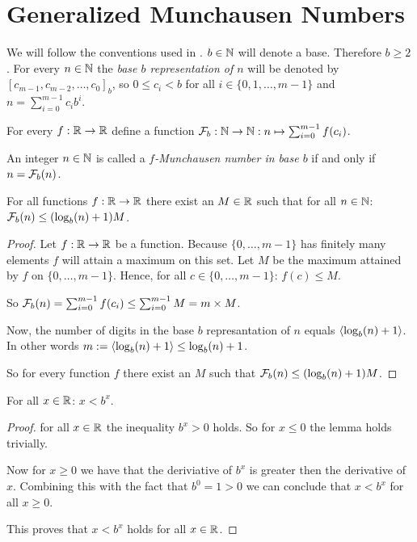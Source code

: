 \section*{Generalized Munchausen Numbers}

We will follow the conventions used in \cite{dvb}. $b\in\mathbb{N}$ will denote a base.
Therefore $b \ge 2$. For every $n \in \mathbb{N}$ the \emph{base $b$ representation
of $n$} will be denoted by $[c_{m-1}, c_{m-2}, \ldots, c_{0}]_{b}$, so 
$0 \le c_{i} < b$ for all $i \in \{0,1,\ldots,m-1\}$ and 
$n = \sum_{i=0}^{m-1} c_{i}b^{i}$.

For every $f : \mathbb{R} \rightarrow \mathbb{R}$ define a function $\mathcal{F}_{b} : \mathbb{N} \rightarrow
\mathbb{N} : n \mapsto \sum_{i=0}^{m-1} f(c_{i})$.

\begin{definition}
	An integer $n \in \mathbb{N}$ is called a \emph{$f$-Munchausen number in base $b$}
	if and only if $n = \mathcal{F}_{b}(n)$.
\end{definition}


\begin{proposition}
	For all functions $f : \mathbb{R} \rightarrow \mathbb{R}$ there exist an 
	$M \in \mathbb{R}$ such that for all $n \in \mathbb{N}$: $\mathcal{F}_{b}(n) \le (\log_{b}(n) + 1) M$.
\end{proposition}

\begin{proof}
	Let $f : \mathbb{R} \rightarrow \mathbb{R}$ be a function. Because $\{0,\ldots,m-1\}$ has 
	finitely many elements $f$ will attain a maximum on this set. Let $M$ be the
	maximum	attained by $f$ on $\{0,\ldots,m-1\}$. Hence, for all 
	$c \in \{0,\ldots,m-1\}$: $f(c) \le M$.
	
	So $\mathcal{F}_{b}(n) = \sum_{i=0}^{m-1} f(c_{i}) \le 
	\sum_{i=0}^{m-1} M = m \times M$.
	
	Now, the number of digits in the base $b$ represantation of $n$ equals 
	$\langle\log_{b}(n) + 1\rangle$. In other words $m := \langle\log_{b}(n) + 1\rangle 
	\le \log_{b}(n) + 1$.
	
	So for every function $f$ there exist an $M$ such that 
	$\mathcal{F}_{b}(n) \le (\log_{b}(n) + 1) M$.
\end{proof}

\begin{lemma}
	For all $x \in \mathbb{R}$: $x < b^{x}$.
\end{lemma}

\begin{proof}
	for all $x \in \mathbb{R}$ the inequality $b^{x} \gt 0$ holds. So for $x \le 0$ the
	lemma holds trivially.
	
	Now for $x \ge 0$ we have that the deriviative of $b^{x}$ is greater then
	the derivative of $x$. Combining this with the fact that $b^{0} = 1 > 0$ we
	can conclude that $x \lt b^{x}$ for all $x \ge 0$.
	
	This proves that $x < b^{x}$ holds for all $x \in \mathbb{R}$.
\end{proof}

